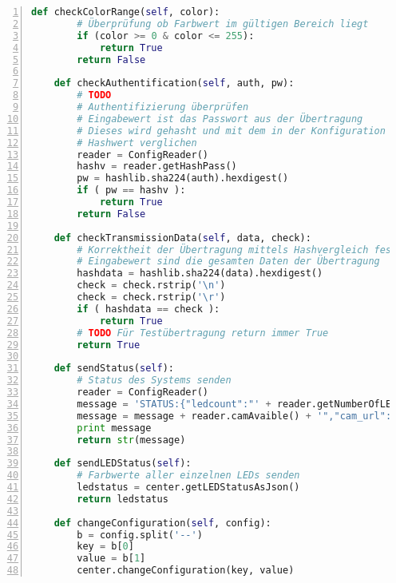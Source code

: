 \begin{lstlisting}[caption =Implementierung des Nachrichten-Verarbeitung in Python, language=python, frame=single, breaklines=true,columns=fullflexible, commentstyle=\color{gray}\upshape, captionpos=b, numbers = left]
    def checkColorRange(self, color):
        # Überprüfung ob Farbwert im gültigen Bereich liegt
        if (color >= 0 & color <= 255):
            return True
        return False

    def checkAuthentification(self, auth, pw):
        # TODO
        # Authentifizierung überprüfen
        # Eingabewert ist das Passwort aus der Übertragung
        # Dieses wird gehasht und mit dem in der Konfiguration gespeicherten
        # Hashwert verglichen
        reader = ConfigReader()
        hashv = reader.getHashPass()
        pw = hashlib.sha224(auth).hexdigest()
        if ( pw == hashv ):
            return True
        return False

    def checkTransmissionData(self, data, check):
        # Korrektheit der Übertragung mittels Hashvergleich feststellen
        # Eingabewert sind die gesamten Daten der Übertragung
        hashdata = hashlib.sha224(data).hexdigest()
        check = check.rstrip('\n')
        check = check.rstrip('\r')
        if ( hashdata == check ):
            return True
        # TODO Für Testübertragung return immer True
        return True

    def sendStatus(self):
        # Status des Systems senden
        reader = ConfigReader()
        message = 'STATUS:{"ledcount":"' + reader.getNumberOfLED() + '","motionport1":"' + reader.getMotionPin1() + '","motionport2":"' + reader.getMotionPin2() + '","ftp_url":"' + reader.getFTP() + '","camavaible":"'
        message = message + reader.camAvaible() + '","cam_url":"' + reader.camURL() + '","cam_url_short":"' + reader.camShortURL() + '","timeperiod":"' + reader.getTimePeriod() + '"}'
        print message
        return str(message)

    def sendLEDStatus(self):
        # Farbwerte aller einzelnen LEDs senden
        ledstatus = center.getLEDStatusAsJson()
        return ledstatus

    def changeConfiguration(self, config):
        b = config.split('--')
        key = b[0]
        value = b[1]
        center.changeConfiguration(key, value)
\end{lstlisting}

